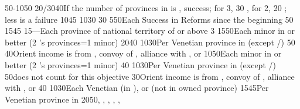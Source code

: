 {50-10}{50}{\EU@objPresidiosTUR}%
%
%
{20/30}{40}{If the number of provinces in \payscrimee is , success; for
  3, 30 \VPs, for 2, 20 \VPs; less is a failure}%
%
%
{10}{45}{}%
%
%
{10}{30}{\EU@objSpiceTUR}%
%
%
%
{}{30}{}%
%
%
{5}{50}{Each Success in Reforms since the beginning}%
%
%
{}{50}{}%
%
%
{15}{45}{}%
%
%
{15}{---}{Each province of national territory of  or
   above 3}%
%
 
%
%
{15}{50}{Each minor in \EG or better (2 's provinces=1 minor)}%
%
%
{20}{40}{}%
%
%
{10}{30}{Per Venetian province in \regionBalkans (except
  \provinceHellas/\provinceMoreas)}%
%
%
{}{50}{}%
%
%
{}{40}{Orient income is from , convoy of \villeIzmir,
  alliance with \paysaden, \paysoman or \paysgujarat}%
%
%
%
{10}{50}{Each minor in \EG or better (2 's provinces=1 minor)}%
%
\EUobjective{}{\provinceMoreas}{}%
{}{40}{}%
%
%
{10}{30}{Per Venetian province in \regionBalkans (except
  \provinceHellas/\provinceMoreas)}%
%
%
{}{50}{\provinceRhodos does not count for this objective}%
%
%
{}{30}{Orient income is from , convoy of \villeIzmir,
  alliance with \paysaden, \paysoman or \paysgujarat}%
%
%
%
{}{40}{}%
%
%
{10}{30}{Each Venetian \Presidio (in ), or \regionBalkans
  (not in owned province)}%
%
%
{15}{45}{Per Venetian province in \regionBalkans}%
%
%
{20}{50}{\provinceChypre, \provinceKreta, \provinceCyclades, \provinceCorfu,
  \provinceMalta, \provinceRhodos}%
